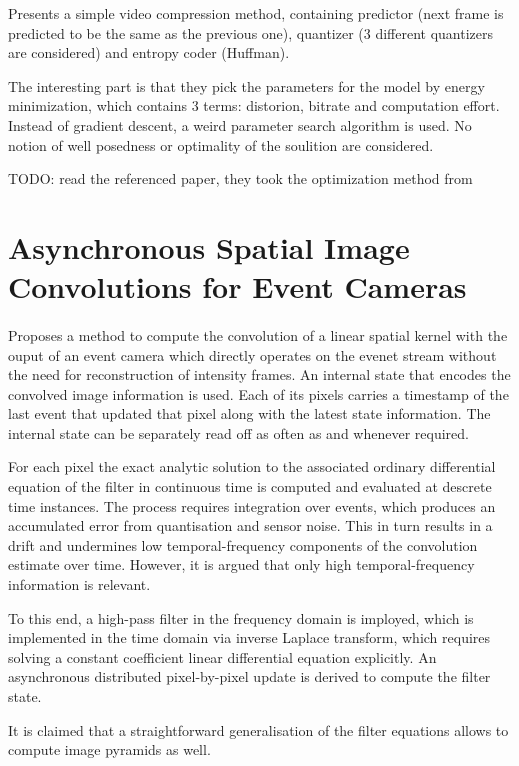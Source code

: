 \documentclass[10pt,a4paper]{article}
\begin{document}
Presents a simple video compression method, containing predictor (next frame is predicted to be the same as the previous one),
quantizer (3 different quantizers are considered) and entropy coder (Huffman).

The interesting part is that they pick the parameters for the model by energy minimization, which contains 3 terms: distorion, bitrate and computation effort.
Instead of gradient descent, a weird parameter search algorithm is used. No notion of well posedness or optimality of the soulition are considered.

TODO: read the referenced paper, they took the optimization method from

\section{Asynchronous Spatial Image Convolutions for Event Cameras}
\paragraph{}
Proposes a method to compute the convolution of a linear spatial kernel with the ouput of an event camera which directly operates on the evenet stream without the need for reconstruction of intensity frames.
An internal state that encodes the convolved image information is used. Each of its pixels carries a timestamp of the last event that updated that pixel along with the latest state information.
The internal state can be separately read off as often as and whenever required.

For each pixel the exact analytic solution to the associated ordinary differential equation of the filter in continuous time is computed and evaluated at descrete time instances.
The process requires integration over events, which produces an accumulated error from quantisation and sensor noise.
This in turn results in a drift and undermines low temporal-frequency components of the convolution estimate over time.
However, it is argued that only high temporal-frequency information is relevant.

To this end, a high-pass filter in the frequency domain is imployed, which is implemented in the time domain via inverse Laplace transform, which requires solving a constant coefficient linear differential equation explicitly.
An asynchronous distributed pixel-by-pixel update is derived to compute the filter state.

It is claimed that a straightforward generalisation of the filter equations allows to compute image pyramids as well.
\end{document}
